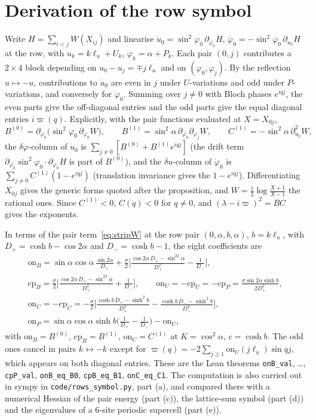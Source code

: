 \documentclass[11pt]{article}
\theoremstyle{definition}
\theoremstyle{remark}
\newcommand{\lean}[1]{\nolinkurl{#1}}
\begin{document}
\section{Derivation of the row symbol}\label{app:rows}
Write $H=\sum_{i<j}W(X_{ij})$ and linearise $\dot u_0=\sin^2\varphi_0\,\partial_{\varphi_0}H$, $\dot\varphi_0=-\sin^2\varphi_0\,\partial_{u_0}H$ at the
row, with $u_k=k\ell_u+U_k$, $\varphi_k=\alpha+P_k$. Each pair $(0,j)$ contributes a $2\times4$ block depending on $u_0-u_j=\mp j\ell_u$ and on
$(\varphi_0,\varphi_j)$. By the reflection $u\mapsto-u$, contributions to $\dot u_0$ are even in $j$ under $U$-variations and odd under
$P$-variations, and conversely for $\dot\varphi_0$. Summing over $j\ne0$ with Bloch phases $e^{iqj}$, the even parts give the off-diagonal
entries and the odd parts give the equal diagonal entries $i\varpi(q)$. Explicitly, with the pair functions evaluated at $X=X_{0j}$,
\[
B^{(0)}=\partial_{\varphi_0}\big(\sin^2\varphi_0\,\partial_{\varphi_0}W\big),\qquad B^{(1)}=\sin^2\alpha\,\partial_{\varphi_0}\partial_{\varphi_j}W,\qquad
C^{(1)}=-\sin^2\alpha\,\partial_{u_0}^2W,
\]
the $\delta\varphi$-column of $\dot u_0$ is $\sum_{j\ne0}[B^{(0)}+B^{(1)}e^{iqj}]$ (the drift term $\partial_{\varphi_0}\sin^2\varphi_0\cdot\partial_{\varphi_0}H$ is
part of $B^{(0)}$), and the $\delta u$-column of $\dot\varphi_0$ is $\sum_{j\ne0}C^{(1)}(1-e^{iqj})$ (translation invariance gives the
$1-e^{iqj}$). Differentiating $X_{0j}$ gives the generic forms quoted after the proposition, and $W=\frac12\log\frac{X+1}{X-1}$ the rational
ones. Since $C^{(1)}<0$, $C(q)<0$ for $q\ne0$, and $(\lambda-i\varpi)^2=BC$ gives the exponents.

In terms of the pair term~\eqref{eq:stripW} at the row pair $(0,\alpha,b,\alpha)$, $b=k\ell_u$, with $D_+=\cosh b-\cos2\alpha$ and
$D_-=\cosh b-1$, the eight coefficients are
\begin{gather*}
\text{on}_B=\sin\alpha\cos\alpha\,\frac{\sin2\alpha}{D_+}+\frac{\sigma}2\Big[\frac{\cos2\alpha\,D_+-\sin^22\alpha}{D_+^2}-\frac1{D_-}\Big],\\
\text{cp}_B=\frac{\sigma}2\Big[\frac{\cos2\alpha\,D_+-\sin^22\alpha}{D_+^2}+\frac1{D_-}\Big],\qquad
\text{on}_U=-\text{cp}_U=-\text{cp}_P=\frac{\sigma\sin2\alpha\sinh b}{2D_+^2},\\
\text{on}_C=-\text{cp}_C=-\frac{\sigma}2\Big[\frac{\cosh b\,D_+-\sinh^2b}{D_+^2}-\frac{\cosh b\,D_--\sinh^2b}{D_-^2}\Big],\\
\text{on}_P=\sin\alpha\cos\alpha\sinh b\Big(\frac1{D_+}-\frac1{D_-}\Big)-\text{on}_U ,
\end{gather*}
with $\text{on}_B=B^{(0)}$, $\text{cp}_B=B^{(1)}$, $\text{on}_C=C^{(1)}$ at $K=\cos^2\alpha$, $c=\cosh b$. The odd ones cancel in pairs
$k\leftrightarrow-k$ except for $\varpi(q)=-2\sum_{j\ge1}\text{on}_U(j\ell_u)\sin qj$, which appears on both diagonal entries. These are
the Lean theorems \lean{onB_val}, \dots, \lean{cpP_val}, \lean{onB_eq_B0}, \lean{cpB_eq_B1}, \lean{onC_eq_C1}. The computation is also carried out in sympy in
\nolinkurl{code/rows_symbol.py}, part (a), and compared there with a numerical Hessian of the pair energy (part (c)), the lattice-sum symbol
(part (d)) and the eigenvalues of a 6-site periodic supercell (part (e)).
\end{document}
